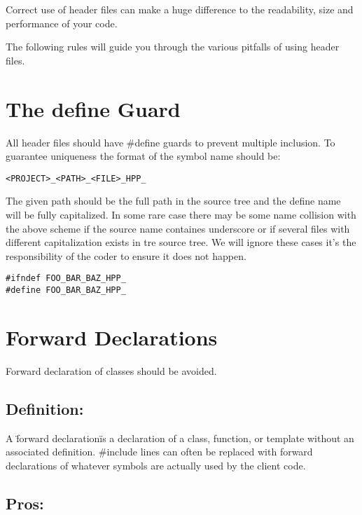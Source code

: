 \documentclass[11pt]{report}
\begin{document}
Correct use of header files can make a huge difference to the readability, size and performance of your code.

The following rules will guide you through the various pitfalls of using header files. 

\section{The define Guard}

All header files should have \#define guards to prevent multiple inclusion. To guarantee uniqueness the format of the symbol name should be:
\vspace{5pt}
\begin{lstlisting}[frame=none]
<PROJECT>_<PATH>_<FILE>_HPP_
\end{lstlisting}
\vspace{-20pt}
 \lstinline{}

The given path should be the full path in the source tree and the define name will be fully capitalized. In some rare case there may be some name collision with the above scheme if the source name containes underscore or if several files with different capitalization exists in tre source tree. We will ignore these cases it's the responsibility of the coder to ensure it does not happen.

\vspace{5pt}
\begin{lstlisting}
#ifndef FOO_BAR_BAZ_HPP_
#define FOO_BAR_BAZ_HPP_
\end{lstlisting}
\vspace{-20pt}


\section{Forward Declarations}

Forward declaration of classes should be avoided. 

\subsection{Definition:} A \"forward declaration\" is a declaration of a class, function, or template without an associated definition. \#include lines can often be replaced with forward declarations of whatever symbols are actually used by the client code.

\subsection{Pros:}
\end{document}
